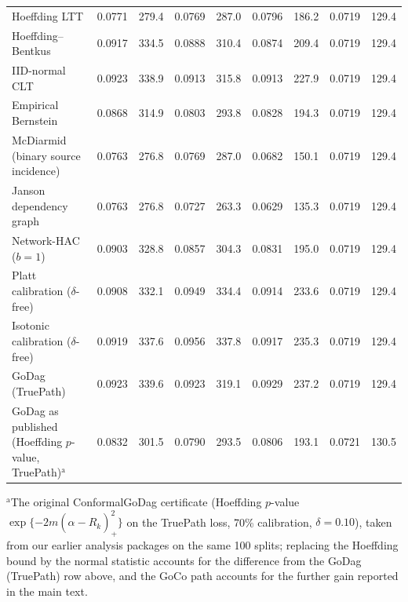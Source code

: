 \begin{table}[!t]
{\begin{tabular}{l rr rr rr rr}
Hoeffding LTT & 0.0771 & 279.4 & 0.0769 & 287.0 & 0.0796 & 186.2 & 0.0719 & 129.4 \\
Hoeffding--Bentkus & 0.0917 & 334.5 & 0.0888 & 310.4 & 0.0874 & 209.4 & 0.0719 & 129.4 \\
IID-normal CLT & 0.0923 & 338.9 & 0.0913 & 315.8 & 0.0913 & 227.9 & 0.0719 & 129.4 \\
Empirical Bernstein & 0.0868 & 314.9 & 0.0803 & 293.8 & 0.0828 & 194.3 & 0.0719 & 129.4 \\
McDiarmid (binary source incidence) & 0.0763 & 276.8 & 0.0769 & 287.0 & 0.0682 & 150.1 & 0.0719 & 129.4 \\
Janson dependency graph & 0.0763 & 276.8 & 0.0727 & 263.3 & 0.0629 & 135.3 & 0.0719 & 129.4 \\
Network-HAC ($b=1$) & 0.0903 & 328.8 & 0.0857 & 304.3 & 0.0831 & 195.0 & 0.0719 & 129.4 \\
Platt calibration ($\delta$-free) & 0.0908 & 332.1 & 0.0949 & 334.4 & 0.0914 & 233.6 & 0.0719 & 129.4 \\
Isotonic calibration ($\delta$-free) & 0.0919 & 337.6 & 0.0956 & 337.8 & 0.0917 & 235.3 & 0.0719 & 129.4 \\
GoDag (TruePath) & 0.0923 & 339.6 & 0.0923 & 319.1 & 0.0929 & 237.2 & 0.0719 & 129.4 \\
GoDag as published (Hoeffding $p$-value, TruePath)$^{\mathrm a}$ & 0.0832 & 301.5 & 0.0790 & 293.5 & 0.0806 & 193.1 & 0.0721 & 130.5 \\
\bottomrule
\end{tabular}}
\par\vspace{3pt}\begin{minipage}{\linewidth}\footnotesize $^{\mathrm a}$The original ConformalGoDag certificate (Hoeffding $p$-value $\exp\{-2m(\alpha-\widehat R_k)_+^2\}$ on the TruePath loss, 70\% calibration, $\delta=0.10$), taken from our earlier analysis packages on the same 100 splits; replacing the Hoeffding bound by the normal statistic accounts for the difference from the GoDag (TruePath) row above, and the GoCo path accounts for the further gain reported in the main text.\end{minipage}
\end{table}